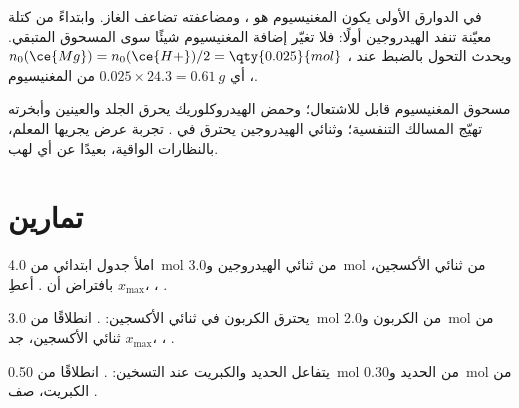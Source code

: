 \begin{remark}\label{rem:g10:reaction-progress-table:plateau}
في الدوارق الأولى يكون المغنيسيوم هو ، ومضاعفته تضاعف الغاز.
وابتداءً من كتلة معيّنة تنفد  الهيدروجين أولًا: فلا تغيّر إضافة المغنيسيوم
شيئًا سوى المسحوق المتبقي. ويحدث التحول بالضبط عند ،
$n_0(\ce{Mg}) = n_0(\ce{H+})/2 = \qty{0.025}{mol}$، أي
$0.025 \times 24.3 = \qty{0.61}{g}$ من المغنيسيوم.
\end{remark}

\begin{safety}{}
مسحوق المغنيسيوم قابل للاشتعال؛ وحمض الهيدروكلوريك يحرق الجلد والعينين وأبخرته
تهيّج المسالك التنفسية؛ وثنائي الهيدروجين يحترق في . تجربة عرض يجريها
المعلم، بالنظارات الواقية، بعيدًا عن أي لهب.
\end{safety}

\section{تمارين}

\begin{exercise}[$\star$]\label{exo:g10:reaction-progress-table:1}
املأ جدول    ابتدائي من
\qty{4.0}{mol} من ثنائي الهيدروجين و\qty{3.0}{mol} من ثنائي الأكسجين، بافتراض
أن . أعطِ $x_{\max}$، ، .
\end{exercise}

\begin{exercise}[$\star$]\label{exo:g10:reaction-progress-table:2}
يحترق الكربون في ثنائي الأكسجين: . انطلاقًا من \qty{3.0}{mol}
من الكربون و\qty{2.0}{mol} من ثنائي الأكسجين، جد $x_{\max}$، ، .
\end{exercise}

\begin{exercise}[$\star$]\label{exo:g10:reaction-progress-table:3}
يتفاعل الحديد والكبريت عند التسخين: . انطلاقًا من
\qty{0.50}{mol} من الحديد و\qty{0.30}{mol} من الكبريت، صف .
\end{exercise}

